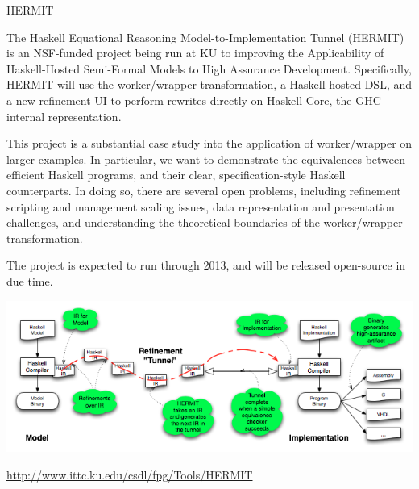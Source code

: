 \begin{hcarentry}{HERMIT}
\label{HERMIT}
\makeheader

The Haskell Equational Reasoning Model-to-Implementation Tunnel
(HERMIT) is an NSF-funded project being run at KU to improving the
Applicability of Haskell-Hosted Semi-Formal Models to High Assurance
Development. Specifically, HERMIT will use the worker/wrapper
transformation, a Haskell-hosted DSL, and a new refinement UI to
perform rewrites directly on Haskell Core, the GHC internal
representation.

This project is a substantial case study into the application of
worker/wrapper on larger examples. In particular, we want to
demonstrate the equivalences between efficient Haskell programs, and
their clear, specification-style Haskell counterparts. In doing so,
there are several open problems, including refinement scripting and
management scaling issues, data representation and presentation
challenges, and understanding the theoretical boundaries of the
worker/wrapper transformation.

The project is expected to run through 2013, and will be released
open-source in due time.

\begin{center}
\includegraphics[width=1\textwidth]{html/HERMIT-tunnel.png}
\end{center}

\FurtherReading
  \url{http://www.ittc.ku.edu/csdl/fpg/Tools/HERMIT}
\end{hcarentry}
